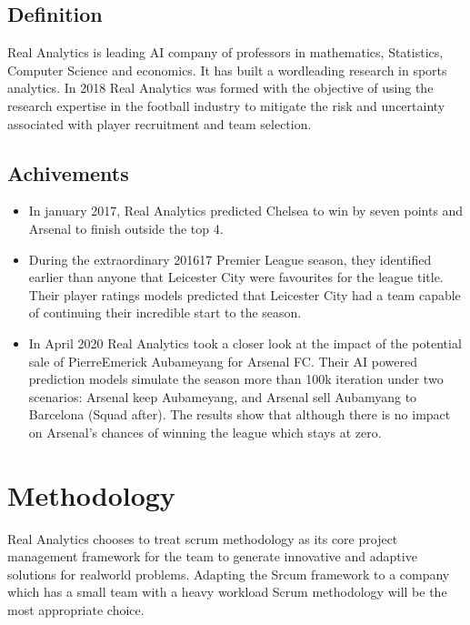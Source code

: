 \documentclass[letterpaper,10pt,english]{jupyterBook}
\begin{document}
\subsection{Definition}
\label{\detokenize{Introduction/introduction:definition}}
\sphinxAtStartPar
Real Analytics is leading AI company of professors in mathematics, Statistics, Computer Science and economics. It has built a word\sphinxhyphen{}leading research in sports analytics.
In 2018 Real Analytics was formed with the objective of using the re\sphinxhyphen{}search expertise in the football industry to mitigate the risk and uncertainty associated with player recruitment and team selection.


\subsection{Achivements}
\label{\detokenize{Introduction/introduction:achivements}}\begin{itemize}
\item {} 
\sphinxAtStartPar
In january 2017, Real Analytics predicted Chelsea to win by seven points and Arsenal to finish outside the top 4.

\item {} 
\sphinxAtStartPar
During the extraordinary 2016\sphinxhyphen{}17 Premier League season, they identified earlier than anyone that Leicester City were favourites for the league title. Their player ratings models predicted that Leicester City had a team capable of continuing their incredible start to the season.

\item {} 
\sphinxAtStartPar
In April 2020 Real Analytics took a closer look at the impact of the potential sale of Pierre\sphinxhyphen{}Emerick Aubameyang for Arsenal FC. Their AI powered prediction models simulate the season more than 100k iteration under two scenarios: Arsenal keep Aubameyang, and Arsenal sell Aubamyang to Barcelona (Squad after). The results show that although there is no impact on Arsenal’s chances of winning the league which stays at zero.

\end{itemize}


\section{Methodology}
\label{\detokenize{Introduction/introduction:methodology}}
\sphinxAtStartPar
Real Analytics chooses to treat scrum methodology as its core project management framework for the team to generate innovative and adaptive solutions for real\sphinxhyphen{}world problems.
Adapting the Srcum framework to a company which has a small team with a heavy workload Scrum methodology will be the most appropriate choice.
\end{document}
